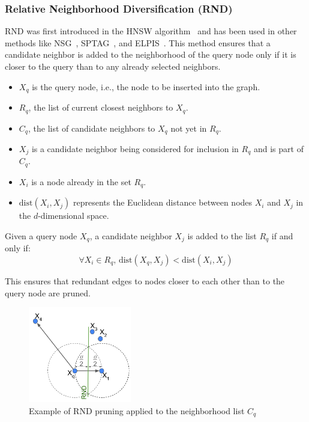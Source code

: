 \subsubsection{Relative Neighborhood Diversification (RND)}
RND was first introduced in the HNSW algorithm~\cite{hnsw} and has been used in other methods like NSG~\cite{nsg}, SPTAG~\cite{SPTAG4}, and ELPIS~\cite{elpis}. This method ensures that a candidate neighbor is added to the neighborhood of the query node only if it is closer to the query than to any already selected neighbors.

\begin{itemize}
    \item \(X_q\) is the query node, i.e., the node to be inserted into the graph.
    \item \(R_q\), the list of current closest neighbors to \(X_q\).
    \item \(C_q\), the list of candidate neighbors to \(X_q\) not yet in \(R_q\).
    \item \(X_j\) is a candidate neighbor being considered for inclusion in \(R_q\) and is part of \(C_q\).
    \item \(X_i\) is a node already in the set \(R_q\).
    \item \(\text{dist}(X_i, X_j)\) represents the Euclidean distance between nodes \(X_i\) and \(X_j\) in the \(d\)-dimensional space.
\end{itemize}

\begin{definition}
\label{def:rnd}
Given a query node \(X_q\), a candidate neighbor \(X_j\) is added to the list \(R_q\) if and only if:
\begin{equation}
    \forall X_i \in R_q, \, \text{dist}(X_q, X_j) < \text{dist}(X_i, X_j)
\end{equation}
\end{definition}

This ensures that redundant edges to nodes closer to each other than to the query node are pruned.

\begin{figure}[h]
    \centering
    \includegraphics[width=0.4\textwidth]{../img/related/rnd.png}
    \caption{Example of RND pruning applied to the neighborhood list \(C_q\)}
    \label{fig:ND:RND}
\end{figure}

